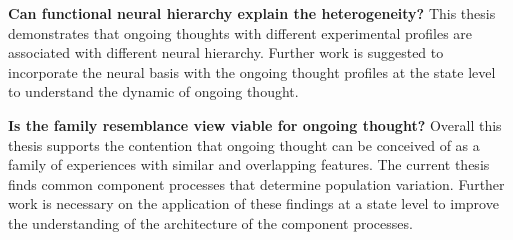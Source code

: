 \textbf{Can functional neural hierarchy explain the heterogeneity?} This thesis demonstrates that ongoing thoughts with different experimental profiles are associated with different neural hierarchy. Further work is suggested to incorporate the neural basis with the ongoing thought profiles at the state level to understand the dynamic of ongoing thought.

\textbf{Is the family resemblance view viable for ongoing thought?} Overall this thesis supports the contention that ongoing thought can be conceived of as a family of experiences with similar and overlapping features. The current thesis finds common component processes that determine population variation. Further work is necessary on the application of these findings at a state level to improve the understanding of the architecture of the component processes.

